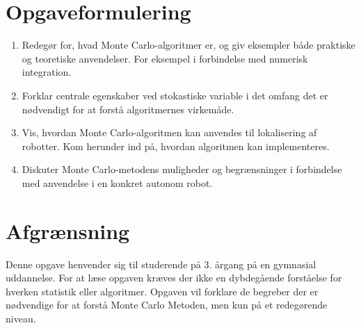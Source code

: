 \documentclass[../../SRP.tex]{subfiles}
\begin{document}
\section{Opgaveformulering}
  \begin{enumerate}[label=(\Roman*)]
  \item Redegør for, hvad Monte Carlo-algoritmer er, og giv eksempler både praktiske og teoretiske anvendelser. For eksempel i forbindelse med numerisk integration.

  \item Forklar centrale egenskaber ved stokastiske variable i det omfang det er nødvendigt for at forstå algoritmernes virkemåde.

  \item Vis, hvordan Monte Carlo-algoritmen kan anvendes til lokalisering af robotter. Kom herunder ind på, hvordan algoritmen kan implementeres.

  \item Diskuter Monte Carlo-metodens muligheder og begrænsninger i forbindelse med anvendelse i en konkret autonom robot.
  \end{enumerate}

\section{Afgrænsning}
Denne opgave henvender sig til studerende på 3. årgang på en gymnasial uddannelse. For at læse opgaven kræves der ikke en dybdegående forståelse for hverken statistik eller algoritmer. Opgaven vil forklare de begreber der er nødvendige for at forstå Monte Carlo Metoden, men kun på et redegørende niveau. 
\end{document}
